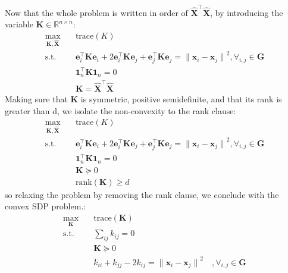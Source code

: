 Now that the whole problem is written in order of $\bm{\hat{X}}^\top \bm{\hat{X}}$, by introducing the variable $\bm{K}\in\mathbb{R}^{n\times n}$:
\begin{align}
    \max_{\bm{K}, \bm{\hat{X}}} \quad
        & \text{trace}\left(K\right) \\
    \textrm{s.t.} \quad 
        & \bm{e}_i^\top \bm{K} \bm{e}_i + 2 \bm{e}_i^\top \bm{K} \bm{e}_j + \bm{e}_j^\top \bm{K} \bm{e}_j = {\| \bm{x}_i - \bm{x}_j \|}^2, \forall_{i,j} \in\bm{G} \\
        & \bm{1}_n^\top \bm{K} \bm{1}_n = 0 \\
        & \bm{K} = \bm{\hat{X}}^\top \bm{\hat{X}}
\end{align}
Making sure that $\bm{K}$ is symmetric, positive semidefinite, and that its rank is greater than d, we isolate the non-convexity to the rank clause:
\begin{align}
    \max_{\bm{K}, \bm{\hat{X}}} \quad
        & \text{trace}\left(K\right) \\
    \textrm{s.t.} \quad 
        & \bm{e}_i^\top \bm{K} \bm{e}_i + 2 \bm{e}_i^\top \bm{K} \bm{e}_j + \bm{e}_j^\top \bm{K} \bm{e}_j = {\| \bm{x}_i - \bm{x}_j \|}^2, \forall_{i,j} \in\bm{G} \\
        & \bm{1}_n^\top \bm{K} \bm{1}_n = 0 \\
        & \bm{K} \succeq 0 \\
        & \text{rank} \left( \bm{K} \right) \ge d
\end{align}
so relaxing the problem by removing the rank clause, we conclude with the convex SDP problem.:
\begin{align}
    \max_{\bm{K}} \quad & \text{trace}(\bm{K}) \\
    \textrm{s.t.} \quad 
        & \sum_{ij} k_{ij} = 0 \\
        & \bm{K} \succeq 0 \\
        & k_{ii} + k_{jj} -2k_{ij} = {\| \bm{x}_i - \bm{x}_j \|}^2 \quad , \forall_{i,j}\in\bm{G}
\end{align}